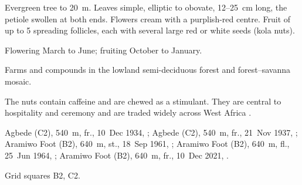  Evergreen tree to 20~m. Leaves simple, elliptic
to obovate, 12--25~cm long, the petiole swollen at both ends. Flowers
cream with a purplish-red centre. Fruit of up to 5 spreading follicles,
each with several large red or white seeds (kola nuts).

 Flowering March to June; fruiting October to
January.

 Farms and compounds in the lowland semi-deciduous
forest and forest--savanna mosaic.

 The nuts contain caffeine and are chewed as a stimulant.
They are central to hospitality and ceremony and are traded widely
across West Africa \citep{keay1989,orwa2009}.

 Agbede (C2), 540~m, fr., 10~Dec 1934, ;
Agbede (C2), 540~m, fr., 21~Nov 1937, ;
Aramiwo Foot (B2), 640~m, st., 18~Sep 1961, ;
Aramiwo Foot (B2), 640~m, fl., 25~Jun 1964, ;
Aramiwo Foot (B2), 640~m, fr., 10~Dec 2021, .

 Grid squares B2, C2.

\begin{center}
\end{center}